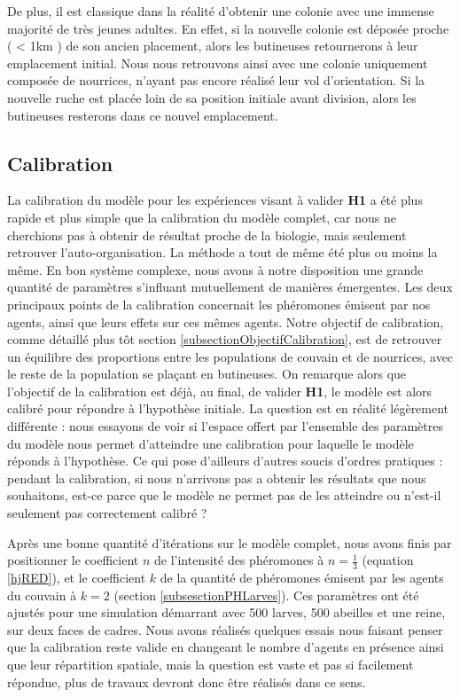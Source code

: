 			De plus, il est classique dans la réalité d'obtenir une colonie avec une immense majorité de très jeunes adultes. En effet, si la nouvelle colonie est déposée proche ( < 1km ) de son ancien placement, alors les butineuses retournerons à leur emplacement initial. Nous nous retrouvons ainsi avec une colonie uniquement composée de nourrices, n'ayant pas encore réalisé leur vol d'orientation. Si la nouvelle ruche est placée loin de sa position initiale avant division, alors les butineuses resterons dans ce nouvel emplacement.
				

		\subsection{Calibration}
		La calibration du modèle pour les expériences visant à valider \textbf{H1} a été plus rapide et plus simple que la calibration du modèle complet, car nous ne cherchions pas à obtenir de résultat proche de la biologie, mais seulement retrouver l'auto-organisation. La méthode a tout de même été plus ou moins la même. En bon système complexe, nous avons à notre disposition une grande quantité de paramètres s'influant mutuellement de manières émergentes. Les deux principaux points de la calibration concernait les phéromones émisent par nos agents, ainsi que leurs effets sur ces mêmes agents. Notre objectif de calibration, comme détaillé plus tôt section \ref{subsectionObjectifCalibration}, est de retrouver un équilibre des proportions entre les populations de couvain et de nourrices, avec le reste de la population se plaçant en butineuses. On remarque alors que l'objectif de la calibration est déjà, au final, de valider \textbf{H1}, le modèle est alors calibré pour répondre à l'hypothèse initiale. La question est en réalité légèrement différente : nous essayons de voir si l'espace offert par l'ensemble des paramètres du modèle nous permet d'atteindre une calibration pour laquelle le modèle réponds à l'hypothèse. Ce qui pose d'ailleurs d'autres soucis d'ordres pratiques : pendant la calibration, si nous n'arrivons pas a obtenir les résultats que nous souhaitons, est-ce parce que le modèle ne permet pas de les atteindre ou n'est-il seulement pas correctement calibré ?
		
		Après une bonne quantité d'itérations sur le modèle complet, nous avons finis par positionner le coefficient $n$ de l'intensité des phéromones à $n = \frac{1}{3}$ (equation \ref{hjRED}), et le coefficient $k$ de la quantité de phéromones émisent par les agents du couvain à $k=2$ (section \ref{subsesctionPHLarves}). Ces paramètres ont été ajustés pour une simulation démarrant avec 500 larves, 500 abeilles et une reine, sur deux faces de cadres. Nous avons réalisés quelques essais nous faisant penser que la calibration reste valide en changeant le nombre d'agents en présence ainsi que leur répartition spatiale, mais la question est vaste et pas si facilement répondue, plus de travaux devront donc être réalisés dans ce sens.
		

